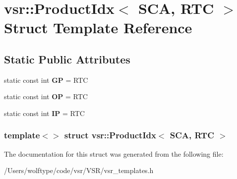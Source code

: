 \hypertarget{structvsr_1_1_product_idx_3_01_s_c_a_00_01_r_t_c_01_4}{\section{vsr\-:\-:Product\-Idx$<$ S\-C\-A, R\-T\-C $>$ Struct Template Reference}
\label{structvsr_1_1_product_idx_3_01_s_c_a_00_01_r_t_c_01_4}
}
\subsection*{Static Public Attributes}
\begin{DoxyCompactItemize}
\item 
\hypertarget{structvsr_1_1_product_idx_3_01_s_c_a_00_01_r_t_c_01_4_a3bf7db63edbd277dd5ff23705bbc0877}{static const int {\bfseries G\-P} = R\-T\-C}\label{structvsr_1_1_product_idx_3_01_s_c_a_00_01_r_t_c_01_4_a3bf7db63edbd277dd5ff23705bbc0877}

\item 
\hypertarget{structvsr_1_1_product_idx_3_01_s_c_a_00_01_r_t_c_01_4_acf6c864ad3d329773adf52d250e34663}{static const int {\bfseries O\-P} = R\-T\-C}\label{structvsr_1_1_product_idx_3_01_s_c_a_00_01_r_t_c_01_4_acf6c864ad3d329773adf52d250e34663}

\item 
\hypertarget{structvsr_1_1_product_idx_3_01_s_c_a_00_01_r_t_c_01_4_ab68ca8d1e48c2fe23fb27c949b4e997f}{static const int {\bfseries I\-P} = R\-T\-C}\label{structvsr_1_1_product_idx_3_01_s_c_a_00_01_r_t_c_01_4_ab68ca8d1e48c2fe23fb27c949b4e997f}

\end{DoxyCompactItemize}
\subsubsection*{template$<$$>$ struct vsr\-::\-Product\-Idx$<$ S\-C\-A, R\-T\-C $>$}



The documentation for this struct was generated from the following file\-:\begin{DoxyCompactItemize}
\item 
/\-Users/wolftype/code/vsr/\-V\-S\-R/vsr\-\_\-templates.\-h\end{DoxyCompactItemize}
